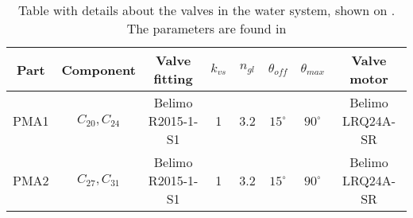 \begin{table}[]
\centering
\begin{adjustbox}{max width=\textwidth}
\begin{tabular}{c|c|c|c|c|c|c|c}
Part & Component 		& Valve fitting 	& $k_{vs}$  & $n_{gl}$  & $\theta_{off}$ & $\theta_{max}$ & Valve motor 	 \\ \hline
PMA1 & $C_{20}, C_{24}$ & Belimo R2015-1-S1 & 1 		& 3.2 		& $15^\circ$	 & $90^\circ$ 	  & Belimo LRQ24A-SR \\
PMA2 & $C_{27}, C_{31}$ & Belimo R2015-1-S1 & 1 		& 3.2 		& $15^\circ$   	 & $90^\circ$ 	  & Belimo LRQ24A-SR
\end{tabular}
\end{adjustbox}
\caption{Table with details about the valves in the water system, shown on . The parameters are found in \citep{Belimo1, Belimo2}}
\label{tab:pip_detail}
\end{table}

